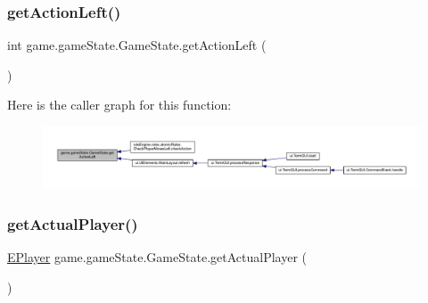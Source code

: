 \subsubsection{\texorpdfstring{get\+Action\+Left()}{getActionLeft()}}
{\footnotesize\ttfamily int game.\+game\+State.\+Game\+State.\+get\+Action\+Left (\begin{DoxyParamCaption}{ }\end{DoxyParamCaption})\hspace{0.3cm}{\ttfamily [inline]}}

Here is the caller graph for this function\+:
\nopagebreak
\begin{figure}[H]
\begin{center}
\leavevmode
\includegraphics[width=350pt]{classgame_1_1game_state_1_1_game_state_ab098a3f062ba9ad6eddc030911d85506_icgraph}
\end{center}
\end{figure}
\mbox{\label{classgame_1_1game_state_1_1_game_state_a418ba65b15c926ef486b0a04090910d0}} 
\subsubsection{\texorpdfstring{get\+Actual\+Player()}{getActualPlayer()}}
{\footnotesize\ttfamily \mbox{\hyperlink{enumgame_1_1_e_player}{E\+Player}} game.\+game\+State.\+Game\+State.\+get\+Actual\+Player (\begin{DoxyParamCaption}{ }\end{DoxyParamCaption})\hspace{0.3cm}{\ttfamily [inline]}}

